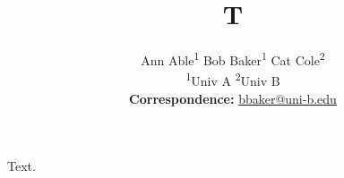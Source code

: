 \documentclass{article}
\title{T}
\author{Ann Able\textsuperscript{1} \quad Bob Baker\textsuperscript{1} \quad Cat Cole\textsuperscript{2} \\
\textsuperscript{1}Univ A \quad \textsuperscript{2}Univ B \\
\small{
  \textbf{Correspondence:} \href{mailto:email@domain}{bbaker@uni-b.edu}
}
}
\begin{document}
\maketitle
Text.
\end{document}
